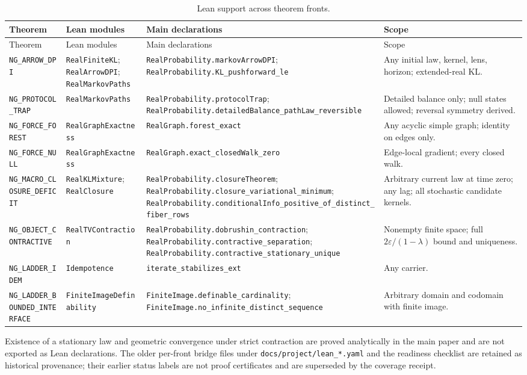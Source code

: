 {\scriptsize
\begin{longtable}{>{\raggedright\arraybackslash}p{} >{\raggedright\arraybackslash}p{} >{\raggedright\arraybackslash}p{} >{\raggedright\arraybackslash}p{}}
\caption{Lean support across theorem fronts.}\label{tab:lean-map}\\
\toprule
Theorem & Lean modules & Main declarations & Scope\\
\midrule
\endfirsthead
\toprule
Theorem & Lean modules & Main declarations & Scope\\
\midrule
\endhead
\bottomrule
\endlastfoot
\texttt{NG\_ARROW\_DPI} & \texttt{RealFiniteKL}; \texttt{RealArrowDPI}; \texttt{RealMarkovPaths} & \texttt{RealProbability.markovArrowDPI}; \texttt{RealProbability.KL\_pushforward\_le} & Any initial law, kernel, lens, horizon; extended-real KL.\\
\texttt{NG\_PROTOCOL\_TRAP} & \texttt{RealMarkovPaths} & \texttt{RealProbability.protocolTrap}; \texttt{RealProbability.detailedBalance\_pathLaw\_reversible} & Detailed balance only; null states allowed; reversal symmetry derived.\\
\texttt{NG\_FORCE\_FOREST} & \texttt{RealGraphExactness} & \texttt{RealGraph.forest\_exact} & Any acyclic simple graph; identity on edges only.\\
\texttt{NG\_FORCE\_NULL} & \texttt{RealGraphExactness} & \texttt{RealGraph.exact\_closedWalk\_zero} & Edge-local gradient; every closed walk.\\
\texttt{NG\_MACRO\_CLOSURE\_DEFICIT} & \texttt{RealKLMixture}; \texttt{RealClosure} & \texttt{RealProbability.closureTheorem}; \texttt{RealProbability.closure\_variational\_minimum}; \texttt{RealProbability.conditionalInfo\_positive\_of\_distinct\_fiber\_rows} & Arbitrary current law at time zero; any lag; all stochastic candidate kernels.\\
\texttt{NG\_OBJECT\_CONTRACTIVE} & \texttt{RealTVContraction} & \texttt{RealProbability.dobrushin\_contraction}; \texttt{RealProbability.contractive\_separation}; \texttt{RealProbability.contractive\_stationary\_unique} & Nonempty finite space; full $2\varepsilon/(1-\lambda)$ bound and uniqueness.\\
\texttt{NG\_LADDER\_IDEM} & \texttt{Idempotence} & \texttt{iterate\_stabilizes\_ext} & Any carrier.\\
\texttt{NG\_LADDER\_BOUNDED\_INTERFACE} & \texttt{FiniteImageDefinability} & \texttt{FiniteImage.definable\_cardinality}; \texttt{FiniteImage.no\_infinite\_distinct\_sequence} & Arbitrary domain and codomain with finite image.\\
\end{longtable}
}

Existence of a stationary law and geometric convergence under strict contraction are proved analytically in the main paper and are not exported as Lean declarations.
The older per-front bridge files under \texttt{docs/project/lean\_*.yaml} and the readiness checklist are retained as historical provenance; their earlier status labels are not proof certificates and are superseded by the coverage receipt.
